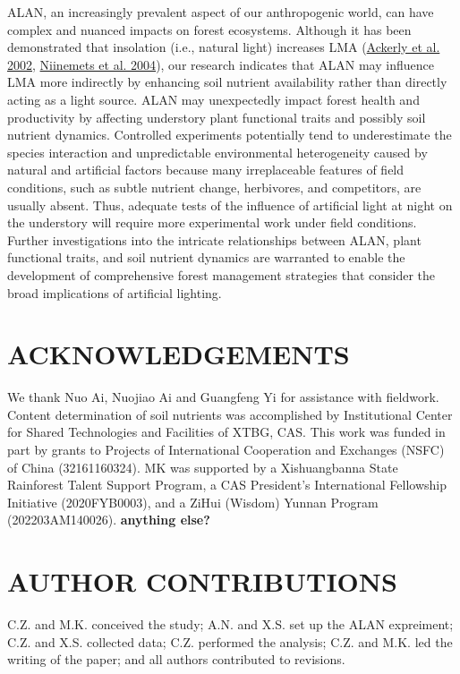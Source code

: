 \documentclass[
  12pt,
  letterpaper,
  DIV=11,
  numbers=noendperiod]{scrartcl}
\begin{document}
ALAN, an increasingly prevalent aspect of our anthropogenic world, can
have complex and nuanced impacts on forest ecosystems. Although it has
been demonstrated that insolation (i.e., natural light) increases LMA
(\protect\hyperlink{ref-Ackerly2002}{Ackerly et al. 2002},
\protect\hyperlink{ref-Niinemets2004}{Niinemets et al. 2004}), our
research indicates that ALAN may influence LMA more indirectly by
enhancing soil nutrient availability rather than directly acting as a
light source. ALAN may unexpectedly impact forest health and
productivity by affecting understory plant functional traits and
possibly soil nutrient dynamics. Controlled experiments potentially tend
to underestimate the species interaction and unpredictable environmental
heterogeneity caused by natural and artificial factors because many
irreplaceable features of field conditions, such as subtle nutrient
change, herbivores, and competitors, are usually absent. Thus, adequate
tests of the influence of artificial light at night on the understory
will require more experimental work under field conditions. Further
investigations into the intricate relationships between ALAN, plant
functional traits, and soil nutrient dynamics are warranted to enable
the development of comprehensive forest management strategies that
consider the broad implications of artificial lighting.

\hypertarget{acknowledgements}{%
\section{ACKNOWLEDGEMENTS}\label{acknowledgements}}

We thank Nuo Ai, Nuojiao Ai and Guangfeng Yi for assistance with
fieldwork. Content determination of soil nutrients was accomplished by
Institutional Center for Shared Technologies and Facilities of XTBG,
CAS. This work was funded in part by grants to Projects of International
Cooperation and Exchanges (NSFC) of China (32161160324). MK was
supported by a Xishuangbanna State Rainforest Talent Support Program, a
CAS President's International Fellowship Initiative (2020FYB0003), and a
ZiHui (Wisdom) Yunnan Program (202203AM140026). \textbf{anything else?}

\hypertarget{author-contributions}{%
\section{AUTHOR CONTRIBUTIONS}\label{author-contributions}}

C.Z. and M.K. conceived the study; A.N. and X.S. set up the ALAN
expreiment; C.Z. and X.S. collected data; C.Z. performed the analysis;
C.Z. and M.K. led the writing of the paper; and all authors contributed
to revisions.
\end{document}
